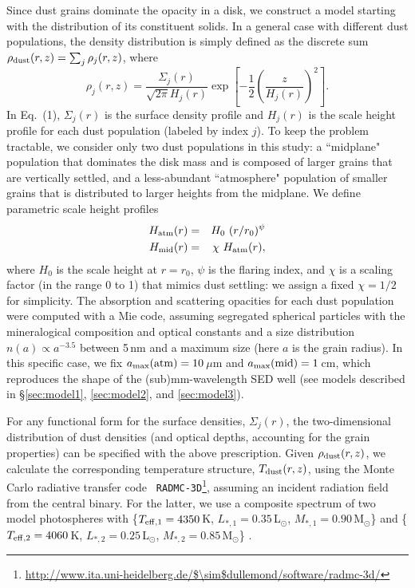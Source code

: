 {Since dust grains dominate the opacity in a disk, we construct a model starting
with the distribution of its constituent solids.  In a general case with
different dust populations, the density distribution is simply defined as the
discrete sum $\rho_{\rm dust}(r,z) = \sum_j \rho_j(r,z)$, where
\begin{equation}
\rho_j(r,z) = \frac{\Sigma_j(r)}{\sqrt{2\pi} H_j(r)} \exp \left[-\frac{1}{2} \left(\frac{z}{H_j(r)}\right)^2\right]. 
\end{equation}
In Eq.~(1), $\Sigma_j(r)$ is the surface density profile and $H_j(r)$ is the
scale height profile for each dust population (labeled by index $j$).  To keep
the problem tractable, we consider only two dust populations in this study: a 
``midplane" population that dominates the disk mass and is composed of larger
grains that are vertically settled, and a less-abundant ``atmosphere" population
of smaller grains that is distributed to larger heights from the midplane.  We 
define parametric scale height profiles 
\begin{eqnarray}
H_{\rm atm}(r) &=& H_0 \,\, (r/r_0)^{\psi} \\
H_{\rm mid}(r) &=& \chi \,\, H_{\rm atm}(r),
\end{eqnarray}
where $H_{0}$ is the scale height at $r = r_0$, $\psi$ is the flaring index,
and $\chi$ is a scaling factor (in the range 0 to 1) that mimics dust 
settling: we assign a fixed $\chi = 1/2$ for simplicity.  The absorption and 
scattering opacities for each dust population were computed with a Mie code, 
assuming segregated spherical particles with the \citet{pollack94} mineralogical
composition and optical constants and a size distribution $n(a) \propto 
a^{-3.5}$ between 5\,nm and a maximum size (here $a$ is the grain radius).  In
this specific case, we fix $a_{\rm max}({\rm atm}) = 10$\,$\mu$m and
$a_{\rm max}({\rm mid}) = 1$\,cm, which reproduces the shape of the 
(sub)mm-wavelength SED well (see models described in \S\ref{sec:model1}, 
\ref{sec:model2}, and \ref{sec:model3}).


For any functional form for the surface densities, $\Sigma_j(r)$, the
two-dimensional distribution of dust densities (and optical depths, accounting
for the grain properties) can be specified with the above prescription.  Given
$\rho_{\rm dust}(r,z)$, we calculate the corresponding temperature structure,
$T_{\rm dust}(r,z)$, using the Monte Carlo radiative transfer code {\tt
RADMC-3D}\footnote{\url{http://www.ita.uni-heidelberg.de/$\sim$dullemond/software/radmc-3d/}}, assuming an incident radiation field from the central binary.
For the latter, we use a composite spectrum of two \citet{lejeune97} model
photospheres with \{$T_{\rm eff,1} = 4350$\,K, $L_{\ast,1} = 
0.35$\,L$_{\odot}$, $M_{\ast,1} = 0.90$\,M$_{\odot}$\} and \{$T_{\rm eff,2} = 
4060$\,K, $L_{\ast,2} = 0.25$\,L$_{\odot}$, $M_{\ast,2} = 0.85$\,M$_{\odot}$\} 
\citep[for details, see][]{rosenfeld12}.

}
